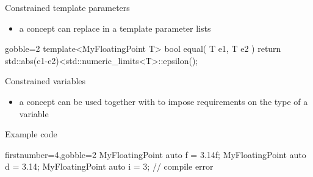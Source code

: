 \begin{frame}[fragile]
    \begin{block}{Constrained template parameters}
      \begin{itemize}
        \item a concept can replace  in a template parameter lists
      \end{itemize}
    \end{block}
    \begin{exampleblock}{}
      \small
      \begin{cppcode*}{gobble=2}
      template<MyFloatingPoint T>
      bool equal( T e1, T e2 ) {
        return std::abs(e1-e2)<std::numeric_limits<T>::epsilon();
      }
      \end{cppcode*}
    \end{exampleblock}
    \begin{block}{Constrained variables}
      \begin{itemize}
        \item a concept can be used together with  to impose requirements on the type of a variable
      \end{itemize}
    \end{block}
    \begin{exampleblock}{Example code}
      \begin{cppcode*}{firstnumber=4,gobble=2}
      MyFloatingPoint auto f = 3.14f;
      MyFloatingPoint auto d = 3.14;
      MyFloatingPoint auto i = 3; // compile error
      \end{cppcode*}
    \end{exampleblock}
\end{frame}


